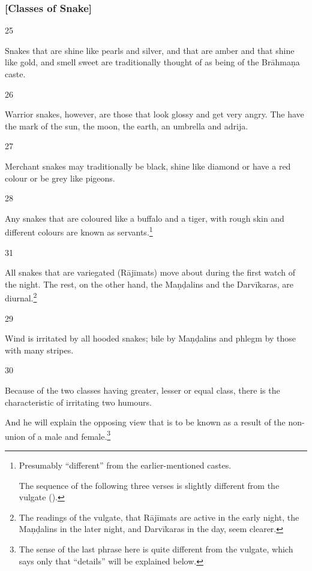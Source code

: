 \begin{translation}
\subsubsection{[Classes of Snake]}

\item[25]

Snakes that are shine like pearls and silver, and that are amber and that
shine like gold, and smell sweet are traditionally thought of as being of
the Brāhmaṇa caste.

\item [26]

Warrior snakes, however, are those that look glossy and get very angry.
The have the mark of the sun, the moon, the earth, an umbrella and
\gls{adrija}.

\item [27]

Merchant snakes may traditionally be black, shine like diamond or have a
red colour or be grey like pigeons.


\item [28]

Any snakes that are coloured like a buffalo and a tiger, with rough skin
and different colours are known as servants.\footnote{Presumably
    “different” from the earlier-mentioned castes.
    
    The sequence of the following three verses is slightly different from the
vulgate ().}

\item[31]

All snakes that are variegated (Rājīmats) move about during the first watch
of the night.  The rest, on the other hand, the Maṇḍalins and the
Darvīkaras, are diurnal.\footnote{The readings of the vulgate, that Rājīmats are 
active in the early night, the Maṇḍalins in the later night, and Darvīkaras in the 
day, seem clearer.}

\item[29]

Wind is irritated by all hooded snakes; bile by Maṇḍalins and phlegm by those 
with many  stripes.

\item [30]

Because of the two classes having greater, lesser or equal class, there is the 
characteristic of irritating two humours.  

And he will explain the opposing view that is to be known as a result of the 
non-union of a male and female.\footnote{The 
sense of the last phrase here is quite different from the vulgate, which says 
only that “details” will be explained below.}



\end{translation}
